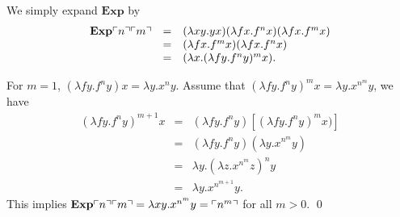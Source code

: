 \begin{pf} \rm We simply expand $\mathbf{Exp}$ by 
\[
\begin{array}{rcl}
 \mathbf{Exp} \ulcorner{n}\urcorner \ulcorner{m}\urcorner & = &
  (\lambda xy.yx) (\lambda fx.f^n x) (\lambda fx.f^m x) \\
 & = & (\lambda fx.f^m x) (\lambda fx.f^n x) \\
 & = & (\lambda x. (\lambda fy.f^n y)^m x). \\
\end{array}
\]

For $m=1$, $(\lambda fy.f^ny) x = \lambda y. x^n y$.
Assume that
$(\lambda fy.f^ny)^m x = \lambda y. x^{n^m} y$,
we have 
\[
 \begin{array}{rcl}
 (\lambda fy.f^ny)^{m+1} x & = &
 (\lambda fy.f^ny) [ (\lambda fy.f^ny)^m x )] \\
 & =& (\lambda fy.f^ny)  (\lambda y.x^{n^m} y) \\
 & = & \lambda y. (\lambda z.x^{n^m} z)^n y \\
 & = & \lambda y. x^{n^{m+1}} y.
  \end{array}
\]
This implies $\mathbf{Exp} \ulcorner{n}\urcorner \ulcorner{m}\urcorner
= \lambda xy. x^{n^{m}}y=\ulcorner{n^m}\urcorner$ for all $m>0$.
 \qed
\end{pf}

